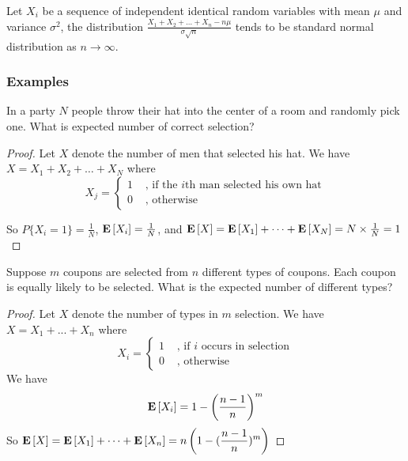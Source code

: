 \begin{theorem}
    Let $X_i$ be a sequence of independent identical random variables with mean $\mu$ and variance $\sigma^2$, the distribution $\displaystyle \frac{X_1 + X_2 + \dots + X_n - n \mu}{\sigma \sqrt{n}}$ tends to be standard normal distribution as $n \rightarrow \infty$.
\end{theorem}




\subsubsection{Examples}

\begin{example}
    In a party $N$ people throw their hat into the center of a room and randomly pick one. What is expected number of correct selection?
\end{example}

\begin{proof}
    Let $X$ denote the number of men that selected his hat. We have $X = X_1 + X_2 + \dots + X_N$ where
    \begin{equation*}
        X_j = \begin{cases}
            1 & \text{ , if the } i \text{th man selected his own hat} \\
            0 & \text{ , otherwise}
        \end{cases}
    \end{equation*}
    
    So $P\{X_i=1\} = \frac{1}{N}$, $\mathop{\bf E\/} \left[ X_i \right] = \frac{1}{N}$, and $\mathop{\bf E\/} \left[ X \right] = \mathop{\bf E\/} \left[ X_1 \right] + \dots + \mathop{\bf E\/} \left[ X_N \right] = N \times \frac{1}{N} = 1$
\end{proof}

\begin{example}
    Suppose $m$ coupons are selected from $n$ different types of coupons. Each coupon is equally likely to be selected. What is the expected number of different types?
\end{example}

\begin{proof}
    Let $X$ denote the number of types in $m$ selection. We have $X = X_1 + ... + X_n$ where
    \begin{equation*}
        X_i = \begin{cases}
            1 & \text{ , if } i \text{ occurs in selection} \\
            0 & \text{ , otherwise}
        \end{cases}
    \end{equation*}
    We have 
    \begin{equation*}
        \mathop{\bf E\/} \left[ X_i \right] = 1 - \left(\frac{n - 1}{n} \right)^m
    \end{equation*}
    So $\mathop{\bf E\/} \left[ X \right] = \mathop{\bf E\/} \left[ X_1 \right] + \dots + \mathop{\bf E\/} \left[ X_n \right] = \displaystyle n \left(1 - (\frac{n - 1}{n})^m \right)$
\end{proof}

